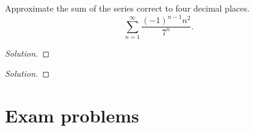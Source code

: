 \begin{problem}[WebAssign HW \# 24, \#]
Approximate the sum of the series correct to four decimal places.
\[
\sum_{n=1}^\infty\frac{(-1)^{n-1}n^2}{7^n}.
\]
\end{problem}
\begin{proof}[Solution]
\end{proof}

\begin{problem}[WebAssign HW \# 24, \#]
\end{problem}
\begin{proof}[Solution]
\end{proof}

\chapter{Exam problems}

